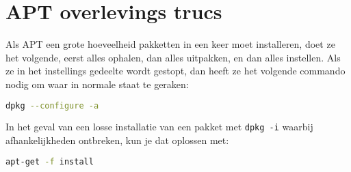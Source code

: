 \appendix
\section{APT overlevings trucs}
Als APT een grote hoeveelheid pakketten in een keer moet installeren, doet ze het volgende, eerst alles ophalen, dan alles uitpakken, en dan alles instellen. Als ze in het instellings gedeelte wordt gestopt, dan heeft ze het volgende commando nodig om waar in normale staat te geraken:
\begin{lstlisting}[language=bash]
dpkg --configure -a
\end{lstlisting}

In het geval van een losse installatie van een pakket met \texttt{dpkg -i} waarbij afhankelijkheden ontbreken, kun je dat oplossen met:
\begin{lstlisting}[language=bash]
apt-get -f install
\end{lstlisting}
